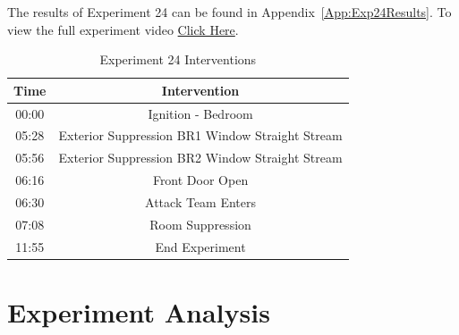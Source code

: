 \documentclass[12pt,oneside]{book}
\begin{document}
The results of Experiment 24 can be found in Appendix~\ref{App:Exp24Results}. To view the full experiment video \href{https://youtu.be/gl8rc1Nsl1k}{Click Here}.


\begin{table}[!ht]
\caption{Experiment 24 Interventions}
\begin{center}
\begin{tabular}{cc}
\toprule
\textbf{Time} 	&  	\textbf{Intervention} \\
\midrule
 	00:00  		&  	Ignition - Bedroom \\
 	05:28  		& 	Exterior Suppression BR1 Window Straight Stream \\
 	05:56 		& 	Exterior Suppression BR2 Window Straight Stream \\		
	06:16 		& 	Front Door Open \\
	06:30 		& 	Attack Team Enters \\
	07:08 		& 	Room Suppression \\
	11:55 		& 	End Experiment \\ 
\bottomrule
\end{tabular}
\end{center}
\label{table:FDS_sensor_info}
\end{table}

\clearpage

\chapter{Experiment Analysis}
\end{document}
